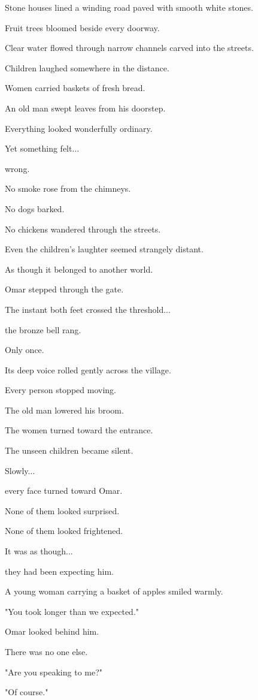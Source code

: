\documentclass[12pt,openany]{book}
\begin{document}
Stone houses lined a winding road paved with smooth white stones.

Fruit trees bloomed beside every doorway.

Clear water flowed through narrow channels carved into the streets.

Children laughed somewhere in the distance.

Women carried baskets of fresh bread.

An old man swept leaves from his doorstep.

Everything looked wonderfully ordinary.

Yet something felt...

wrong.

No smoke rose from the chimneys.

No dogs barked.

No chickens wandered through the streets.

Even the children's laughter seemed strangely distant.

As though it belonged to another world.

Omar stepped through the gate.

The instant both feet crossed the threshold...

the bronze bell rang.

Only once.

Its deep voice rolled gently across the village.

Every person stopped moving.

The old man lowered his broom.

The women turned toward the entrance.

The unseen children became silent.

Slowly...

every face turned toward Omar.

None of them looked surprised.

None of them looked frightened.

It was as though...

they had been expecting him.

A young woman carrying a basket of apples smiled warmly.

"You took longer than we expected."

Omar looked behind him.

There was no one else.

"Are you speaking to me?"

"Of course."
\end{document}
